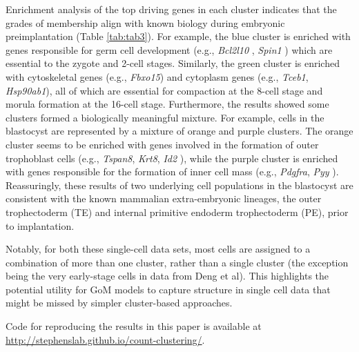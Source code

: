 
Enrichment analysis of the top driving genes in each cluster indicates that the grades of membership align with known biology during embryonic preimplantation (Table \ref{tab:tab3}). For example, the blue cluster is enriched with genes responsible for germ cell development (e.g., \textit{Bcl2l10} \cite{Yoon2009}, \textit{Spin1} \cite{Evsikov2009}) which are essential to the zygote and 2-cell stages. Similarly, the green cluster is enriched with cytoskeletal genes (e.g., \textit{Fbxo15}) and cytoplasm genes (e.g., \textit{Tceb1}, \textit{Hsp90ab1}), all of which are essential for compaction at the 8-cell stage and morula formation at the 16-cell stage. Furthermore, the results showed some clusters formed a biologically meaningful mixture. For example, cells in the blastocyst are represented by a mixture of orange and purple clusters. The orange cluster seems to be  enriched with genes involved in the formation of outer trophoblast cells (e.g., \textit{Tspan8}, \textit{Krt8}, \textit{Id2} \cite{Guo2010}), while the purple cluster is enriched with genes responsible for the formation of inner cell mass (e.g., \textit{Pdgfra}, \textit{Pyy} \cite{Hou2007}). Reassuringly, these results of two underlying cell populations in the blastocyst are consistent with the known mammalian extra-embryonic lineages, the outer trophectoderm (TE) and internal primitive endoderm trophectoderm (PE), prior to implantation.


Notably, for both these single-cell data sets, most cells are assigned to a combination of more than one cluster, rather than a single cluster (the exception being the very early-stage cells in data from Deng et al). This highlights the potential utility for GoM models to capture structure in single cell data that might be missed by simpler cluster-based approaches.

Code for reproducing the results in this paper is available at \url{http://stephenslab.github.io/count-clustering/}.





